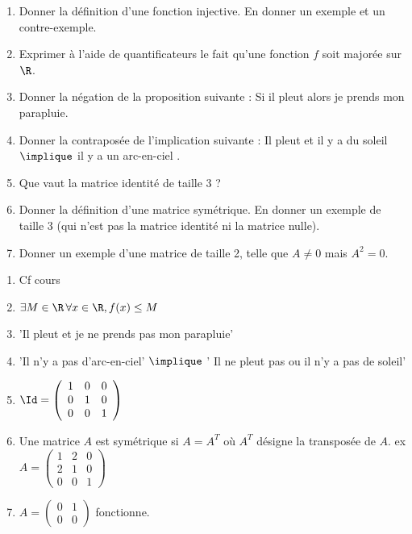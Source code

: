 \documentclass[a4paper, 11pt,reqno]{article}
\begin{document}
\begin{exercice}
\begin{enumerate}
\item Donner la définition d'une fonction injective. En donner un exemple et un contre-exemple.
\item  Exprimer à l'aide de quantificateurs le fait qu'une fonction $f$ soit majorée sur $\R$.
\item Donner la négation de la proposition suivante : \og Si il pleut alors je prends mon parapluie.\fg
\item Donner la contraposée de l'implication suivante : \og Il pleut et il y a du soleil \fg  $\implique $ \og il y a un arc-en-ciel . \fg  
\item Que vaut la matrice identité de taille 3 ?
\item Donner la définition d'une matrice symétrique. En donner un exemple de taille 3 (qui n'est pas la matrice identité ni la matrice nulle).
\item Donner un exemple d'une matrice de taille 2, telle que $A\neq 0$ mais $A^2=0$.
\end{enumerate}
\end{exercice}
\begin{correction}
\begin{enumerate}
\item Cf cours
\item $\exists M\in \R\, \forall x\in \R, f(x)\leq M$
\item 'Il pleut  et je ne prends pas mon parapluie'
\item 'Il n'y a pas d'arc-en-ciel' $\implique$ ' Il ne pleut pas ou il n'y a pas de soleil'
\item $\Id=\left(\begin{array}{ccc}
1&0&0\\
0&1&0\\
0&0&1
\end{array}\right)$
\item Une matrice $A$ est symétrique si  $A=A^T$ où $A^T$ désigne la transposée de $A$. 
ex $A=\left(\begin{array}{ccc}
1&2&0\\
2&1&0\\
0&0&1
\end{array}\right)$
\item $A=\left(\begin{array}{cc}
0&1\\
0&0
\end{array}\right)$ fonctionne. 
\end{enumerate}
\end{correction}
\vspace{1cm}
\end{document}
